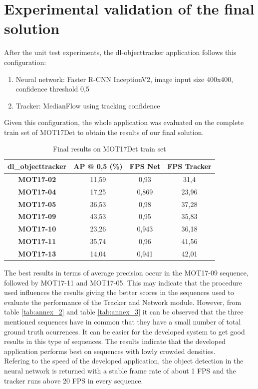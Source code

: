 \section{Experimental validation of the final solution}\label{final_sol}
After the unit test experiments, the dl-objecttracker application follows this configuration:
\begin{enumerate}
    \item Neural network: Faster R-CNN InceptionV2, image input size 400x400, confidence threshold 0,5
    \item Tracker: MedianFlow using tracking confidence
\end{enumerate}
Given this configuration, the whole application was evaluated on the complete train set of MOT17Det to obtain the results of our final solution.
\begin{table}[H]
\begin{center}
\begin{tabular}{|c|c|c|c|}
\hline
\textbf{dl\_objecttracker} & \textbf{AP @ 0,5 (\%)} & \textbf{FPS Net} & \multicolumn{1}{l|}{\textbf{FPS Tracker}} \\ \hline
\textbf{MOT17-02}          & 11,59                  & 0,93             & 31,4                                      \\ \hline
\textbf{MOT17-04}          & 17,25                  & 0,869            & 23,96                                     \\ \hline
\textbf{MOT17-05}          & 36,53                  & 0,98             & 37,28                                     \\ \hline
\textbf{MOT17-09}          & 43,53                  & 0,95             & 35,83                                     \\ \hline
\textbf{MOT17-10}          & 23,26                  & 0,943            & 36,18                                     \\ \hline
\textbf{MOT17-11}          & 35,74                  & 0,96             & 41,56                                     \\ \hline
\textbf{MOT17-13}          & 14,04                  & 0,941            & 42,01                                     \\ \hline
\end{tabular}
\end{center}
\caption{Final results on MOT17Det train set}
\label{tab:final}
\end{table}
The best results in terms of average precision occur in the MOT17-09 sequence, followed by MOT17-11 and MOT17-05. This may indicate that the procedure used influences the results giving the better scores in the sequences used to evaluate the performance of the Tracker and Network module. However, from table \ref{tab:annex_2} and table \ref{tab:annex_3} it can be observed that the three mentioned sequences have in common that they have a small number of total ground truth ocurrences. It can be easier for the developed system to get good results in this type of sequences. The results indicate that the developed application performs best on sequences with lowly crowded densities.\\
Refering to the speed of the developed application, the object detection in the neural network is returned with a stable frame rate of about 1 FPS and the tracker runs above 20 FPS in every sequence.